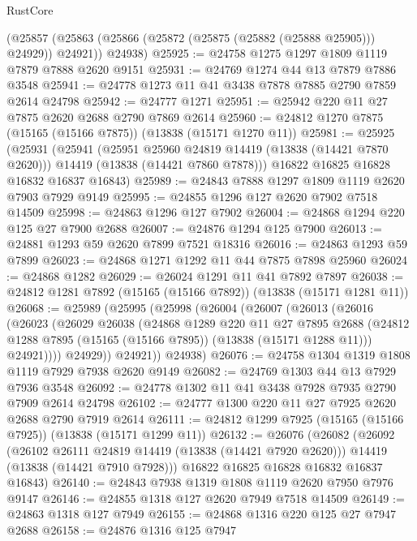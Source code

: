 \begin{lexlean}{RustCore}
\begin{coremodule}
      (@25857 (@25863 (@25866 (@25872 (@25875 (@25882 (@25888 @25905))) @24929)) @24921))
      @24938)
@25925 := @24758 @1275 @1297 @1809 @1119 @7879 @7888 @2620 @9151
@25931 := @24769 @1274 @44 @13 @7879 @7886 @3548
@25941 := @24778 @1273 @11 @41 @3438 @7878 @7885 @2790 @7859 @2614 @24798
@25942 := @24777 @1271
@25951 := @25942 @220 @11 @27 @7875 @2620 @2688 @2790 @7869 @2614
@25960 := @24812 @1270 @7875 (@15165 (@15166 @7875)) (@13838 (@15171 @1270 @11))
@25981 := @25925
    (@25931
      (@25941
        (@25951 @25960 @24819 @14419 (@13838 (@14421 @7870 @2620)))
        @14419
        (@13838 (@14421 @7860 @7878)))
      @16822
      @16825
      @16828
      @16832
      @16837
      @16843)
@25989 := @24843 @7888 @1297 @1809 @1119 @2620 @7903 @7929 @9149
@25995 := @24855 @1296 @127 @2620 @7902 @7518 @14509
@25998 := @24863 @1296 @127 @7902
@26004 := @24868 @1294 @220 @125 @27 @7900 @2688
@26007 := @24876 @1294 @125 @7900
@26013 := @24881 @1293 @59 @2620 @7899 @7521 @18316
@26016 := @24863 @1293 @59 @7899
@26023 := @24868 @1271 @1292 @11 @44 @7875 @7898 @25960
@26024 := @24868 @1282
@26029 := @26024 @1291 @11 @41 @7892 @7897
@26038 := @24812 @1281 @7892 (@15165 (@15166 @7892)) (@13838 (@15171 @1281 @11))
@26068 := @25989
    (@25995
      (@25998
        (@26004
          (@26007
            (@26013
              (@26016
                (@26023
                  (@26029
                    @26038
                    (@24868
                      @1289
                      @220
                      @11
                      @27
                      @7895
                      @2688
                      (@24812 @1288 @7895 (@15165 (@15166 @7895)) (@13838 (@15171 @1288 @11)))
                      @24921))))
              @24929))
          @24921))
      @24938)
@26076 := @24758 @1304 @1319 @1808 @1119 @7929 @7938 @2620 @9149
@26082 := @24769 @1303 @44 @13 @7929 @7936 @3548
@26092 := @24778 @1302 @11 @41 @3438 @7928 @7935 @2790 @7909 @2614 @24798
@26102 := @24777 @1300 @220 @11 @27 @7925 @2620 @2688 @2790 @7919 @2614
@26111 := @24812 @1299 @7925 (@15165 (@15166 @7925)) (@13838 (@15171 @1299 @11))
@26132 := @26076
    (@26082
      (@26092
        (@26102 @26111 @24819 @14419 (@13838 (@14421 @7920 @2620)))
        @14419
        (@13838 (@14421 @7910 @7928)))
      @16822
      @16825
      @16828
      @16832
      @16837
      @16843)
@26140 := @24843 @7938 @1319 @1808 @1119 @2620 @7950 @7976 @9147
@26146 := @24855 @1318 @127 @2620 @7949 @7518 @14509
@26149 := @24863 @1318 @127 @7949
@26155 := @24868 @1316 @220 @125 @27 @7947 @2688
@26158 := @24876 @1316 @125 @7947

\end{coremodule}
\end{lexlean}
